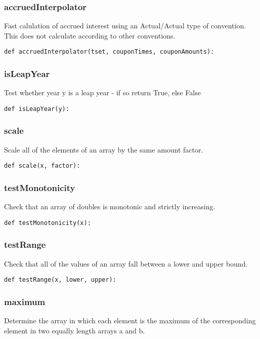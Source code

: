 \documentclass[twoside,11pt]{book}
\begin{document}
\subsubsection*{{\bf accruedInterpolator}}
Fast calulation of accrued interest using an Actual/Actual type of convention. This does not calculate according to other conventions.  

\begin{lstlisting}
def accruedInterpolator(tset, couponTimes, couponAmounts):
\end{lstlisting}

\subsubsection*{{\bf isLeapYear}}
Test whether year y is a leap year - if so return True, else False  

\begin{lstlisting}
def isLeapYear(y):
\end{lstlisting}

\subsubsection*{{\bf scale}}
Scale all of the elements of an array by the same amount factor.  

\begin{lstlisting}
def scale(x, factor):
\end{lstlisting}

\subsubsection*{{\bf testMonotonicity}}
Check that an array of doubles is monotonic and strictly increasing. 

\begin{lstlisting}
def testMonotonicity(x):
\end{lstlisting}

\subsubsection*{{\bf testRange}}
Check that all of the values of an array fall between a lower and upper bound.  

\begin{lstlisting}
def testRange(x, lower, upper):
\end{lstlisting}

\subsubsection*{{\bf maximum}}
Determine the array in which each element is the maximum of the corresponding element in two equally length arrays a and b.  
\end{document}
